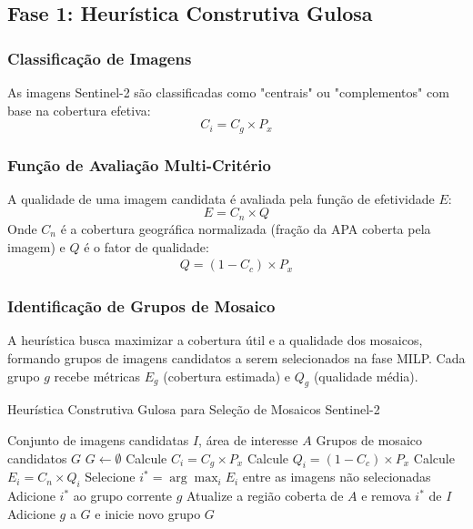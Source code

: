 \documentclass[a4paper,11pt]{article}
\begin{document}
\subsection{Fase 1: Heurística Construtiva Gulosa}

\subsubsection{Classificação de Imagens}
As imagens Sentinel-2 são classificadas como "centrais" ou "complementos" com base na cobertura efetiva:
\begin{equation}
C_i = C_g \times P_x
\end{equation}

\subsubsection{Função de Avaliação Multi-Critério}
A qualidade de uma imagem candidata é avaliada pela função de efetividade $E$:
\begin{equation}
E = C_n \times Q
\end{equation}
Onde $C_n$ é a cobertura geográfica normalizada (fração da APA coberta pela imagem) e $Q$ é o fator de qualidade:
\begin{align}
Q = (1 - C_c) \times P_x
\end{align}

\subsubsection{Identificação de Grupos de Mosaico}
A heurística busca maximizar a cobertura útil e a qualidade dos mosaicos, formando grupos de imagens candidatos a serem selecionados na fase MILP. Cada grupo $g$ recebe métricas $E_g$ (cobertura estimada) e $Q_g$ (qualidade média).

\begin{algorithm}[H]
\caption{Heurística Construtiva Gulosa para Seleção de Mosaicos Sentinel-2}
\begin{algorithmic}[1]
\Require Conjunto de imagens candidatas $I$, área de interesse $A$
\Ensure Grupos de mosaico candidatos $G$
\State $G \gets \emptyset$
        \State Calcule $C_i = C_g \times P_x$
        \State Calcule $Q_i = (1 - C_c) \times P_x$
        \State Calcule $E_i = C_n \times Q_i$
    \EndFor
    \State Selecione $i^* = \arg\max_{i} E_i$ entre as imagens não selecionadas
    \State Adicione $i^*$ ao grupo corrente $g$
    \State Atualize a região coberta de $A$ e remova $i^*$ de $I$
        \State Adicione $g$ a $G$ e inicie novo grupo
    \EndIf
\EndWhile
\State \Return $G$
\end{algorithmic}
\end{algorithm}
\end{document}
